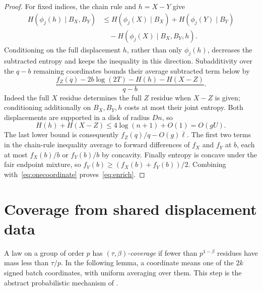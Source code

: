 \documentclass[11pt]{article}
\numberwithin{equation}{section}
\theoremstyle{definition}\newtheorem{definition}[theorem]{Definition}
\theoremstyle{remark}\newtheorem{remark}[theorem]{Remark}
\newcommand{\Lb}{\overline{\ell}}
\begin{document}
\begin{proof}
For fixed indices, the chain rule and $h=X-Y$ give
\begin{align*}
 H(\phi_j(h)\mid B_X,B_Y)
 &\le H(\phi_j(X)\mid B_X)+H(\phi_j(Y)\mid B_Y)\\
 &\hspace{1em}-H(\phi_j(X)\mid B_X,B_Y,h).
\end{align*}
Conditioning on the full displacement $h$, rather than only $\phi_j(h)$, decreases the subtracted entropy and keeps the inequality in this direction. Subadditivity over the $q-b$ remaining coordinates bounds their average subtracted term below by
\[
 \frac{f_Z(q)-2b\log(2T)-H(h)-H(X-Z)}{q-b}.
\]
Indeed the full $X$ residue determines the full $Z$ residue when $X-Z$ is given; conditioning additionally on $B_X,B_Y,h$ costs at most their joint entropy. Both displacements are supported in a disk of radius $Dn$, so
\[
 H(h)+H(X-Z)\le4\log(n+1)+O(1)=O(gU).
\]
The last lower bound is consequently $f_Z(q)/q-O(g)\Lb$. The first two terms in the chain-rule inequality average to forward differences of $f_X$ and $f_Y$ at $b$, each at most $f_X(b)/b$ or $f_Y(b)/b$ by concavity. Finally entropy is concave under the fair endpoint mixture, so $f_V(b)\ge(f_X(b)+f_Y(b))/2$. Combining with~\eqref{eq:onecoordinate} proves~\eqref{eq:enrich}.
\end{proof}

\section{Coverage from shared displacement data}\label{sec:coverage}

A law on a group of order $p$ has \emph{$(\tau,\beta)$-coverage} if fewer than $p^{1-\beta}$ residues have mass less than $\tau/p$. In the following lemma, a coordinate means one of the $2k$ signed batch coordinates, with uniform averaging over them. This step is the abstract probabilistic mechanism of \cite[Theorem 5.2]{openai}.
\end{document}
